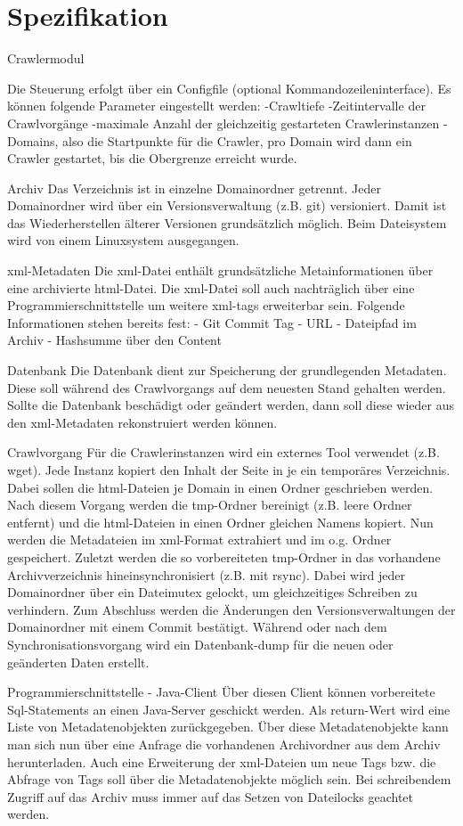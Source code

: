 \chapter{Spezifikation}

Crawlermodul

Die Steuerung erfolgt über ein Configfile (optional Kommandozeileninterface).
Es können folgende Parameter eingestellt werden:
	-Crawltiefe
	-Zeitintervalle der Crawlvorgänge
	-maximale Anzahl der gleichzeitig gestarteten Crawlerinstanzen
	-Domains, also die Startpunkte für die Crawler, pro Domain wird dann ein Crawler gestartet,
		bis die Obergrenze erreicht wurde.

Archiv
Das Verzeichnis ist in einzelne Domainordner getrennt. Jeder Domainordner wird über ein Versionsverwaltung
(z.B. git) versioniert. Damit ist das Wiederherstellen älterer Versionen grundsätzlich möglich.
Beim Dateisystem wird von einem Linuxsystem ausgegangen.

xml-Metadaten
Die xml-Datei enthält grundsätzliche Metainformationen über eine archivierte html-Datei.
Die xml-Datei soll auch nachträglich über eine Programmierschnittstelle um weitere xml-tags erweiterbar sein.
Folgende Informationen stehen bereits fest: 
- Git Commit Tag
- URL
- Dateipfad im Archiv
- Hashsumme über den Content

Datenbank
Die Datenbank dient zur Speicherung der grundlegenden Metadaten.
Diese soll während des Crawlvorgangs auf dem neuesten Stand gehalten werden.
Sollte die Datenbank beschädigt oder geändert werden, dann soll diese wieder aus den
xml-Metadaten rekonstruiert werden können.
 
Crawlvorgang
Für die Crawlerinstanzen wird ein externes Tool verwendet (z.B. wget).
Jede Instanz kopiert den Inhalt der Seite in je ein temporäres Verzeichnis.
Dabei sollen die html-Dateien je Domain in einen Ordner geschrieben werden.
Nach diesem Vorgang werden die tmp-Ordner bereinigt (z.B. leere Ordner entfernt)
und die html-Dateien in einen Ordner gleichen Namens kopiert.
Nun werden die Metadateien im xml-Format extrahiert und im o.g. Ordner gespeichert.
Zuletzt werden die so vorbereiteten tmp-Ordner in das vorhandene Archivverzeichnis
hineinsynchronisiert (z.B. mit rsync). Dabei wird jeder Domainordner über ein Dateimutex gelockt, um
gleichzeitiges Schreiben zu verhindern.
Zum Abschluss werden die Änderungen den Versionsverwaltungen der Domainordner mit einem Commit bestätigt.
Während oder nach dem Synchronisationsvorgang wird ein Datenbank-dump für die neuen oder geänderten Daten
erstellt. 

Programmierschnittstelle - Java-Client
Über diesen Client können vorbereitete Sql-Statements an einen Java-Server geschickt werden. Als return-Wert
wird eine Liste von Metadatenobjekten zurückgegeben.
Über diese Metadatenobjekte kann man sich nun über eine Anfrage die vorhandenen Archivordner aus dem Archiv herunterladen.
Auch eine Erweiterung der xml-Dateien um neue Tags bzw. die Abfrage von Tags soll über die 
Metadatenobjekte möglich sein.
Bei schreibendem Zugriff auf das Archiv muss immer auf das Setzen von Dateilocks geachtet werden.


 
